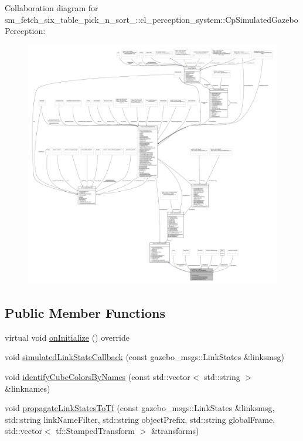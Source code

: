 Collaboration diagram for sm\+\_\+fetch\+\_\+six\+\_\+table\+\_\+pick\+\_\+n\+\_\+sort\+\_\+:\+:cl\+\_\+perception\+\_\+system\+:\+:Cp\+Simulated\+Gazebo\+Perception\+:
\nopagebreak
\begin{figure}[H]
\begin{center}
\leavevmode
\includegraphics[width=350pt]{classsm__fetch__six__table__pick__n__sort__1_1_1cl__perception__system_1_1CpSimulatedGazeboPerception__coll__graph}
\end{center}
\end{figure}
\subsection*{Public Member Functions}
\begin{DoxyCompactItemize}
\item 
virtual void \hyperlink{classsm__fetch__six__table__pick__n__sort__1_1_1cl__perception__system_1_1CpSimulatedGazeboPerception_a59ebcf12c7fe1f7933ae4d741bc8aaea}{on\+Initialize} () override
\item 
void \hyperlink{classsm__fetch__six__table__pick__n__sort__1_1_1cl__perception__system_1_1CpSimulatedGazeboPerception_a8423ebb530a05ca9fc660a3d77676dbb}{simulated\+Link\+State\+Callback} (const gazebo\+\_\+msgs\+::\+Link\+States \&linksmsg)
\item 
void \hyperlink{classsm__fetch__six__table__pick__n__sort__1_1_1cl__perception__system_1_1CpSimulatedGazeboPerception_a072f6dd3a13d410172c8d3136314ab1a}{identify\+Cube\+Colors\+By\+Names} (const std\+::vector$<$ std\+::string $>$ \&linknames)
\item 
void \hyperlink{classsm__fetch__six__table__pick__n__sort__1_1_1cl__perception__system_1_1CpSimulatedGazeboPerception_a40276b12f8e7993a30428cea7cf3a302}{propagate\+Link\+States\+To\+Tf} (const gazebo\+\_\+msgs\+::\+Link\+States \&linksmsg, std\+::string link\+Name\+Filter, std\+::string object\+Prefix, std\+::string global\+Frame, std\+::vector$<$ tf\+::\+Stamped\+Transform $>$ \&transforms)
\end{DoxyCompactItemize}
